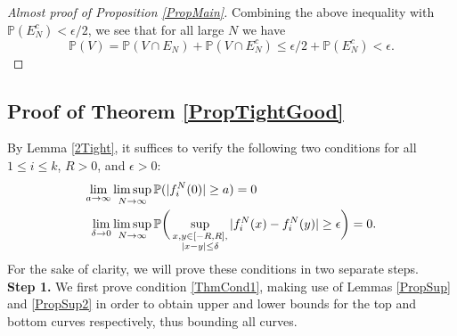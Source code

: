 \begin{proof}[Almost proof of Proposition \ref{PropMain}]
	Combining the above inequality with $\mathbb{P}(E_N^c) <  \epsilon/2$, we see that for all large $N$ we have
	$$\mathbb{P}\left( V  \right) = \mathbb{P}(V \cap E_N) + \mathbb{P}(V \cap E_N^c) \leq \epsilon/2 + \mathbb{P}(E_N^c) < \epsilon.$$
\end{proof}


%
\subsection{Proof of Theorem \ref{PropTightGood} }\label{Section4.2}
	
	By Lemma \ref{2Tight}, it suffices to verify the following two conditions for all $1\leq i\leq k$, $R>0$, and $\epsilon>0$:
	\begin{align}
	\lim_{a\to\infty} &\limsup_{N\to\infty} \mathbb{P}(|f^N_i(0)|\geq a) = 0 \label{ThmCond1}\\
	\lim_{\delta\to 0} &\limsup_{N\to\infty} \mathbb{P}\bigg(\sup_{\substack{x,y\in [-R,R], \\ |x-y|\leq\delta}} |f^N_i(x) - f^N_i(y)| \geq \epsilon\bigg)= 0. \label{ThmCond2}
	\end{align}
	For the sake of clarity, we will prove these conditions in two separate steps.\\
	
	\noindent\textbf{Step 1.} We first prove condition \eqref{ThmCond1}, making use of Lemmas \ref{PropSup} and \ref{PropSup2} in order to obtain upper and lower bounds for the top and bottom curves respectively, thus bounding all curves.
	
